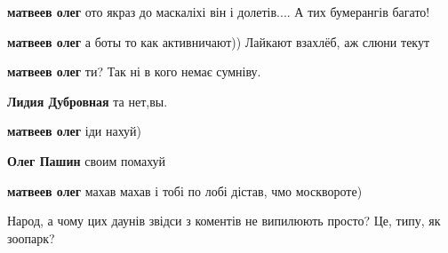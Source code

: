 \begin{itemize}
\begin{itemize}
\textbf{матвеев олег} ото якраз до маскаліхі він і долетів.... А тих бумерангів багато! \Laughey[1.0][white]

 
\textbf{матвеев олег} а боты то как активничают))
Лайкают взахлёб, аж слюни текут

 
\textbf{матвеев олег} ти? Так ні в кого немає сумніву.

 
\textbf{Лидия Дубровная} та нет,вы.

 
\textbf{матвеев олег} іди нахуй)

 
\textbf{Олег Пашин} своим помахуй

 
\textbf{матвеев олег} махав махав і тобі по лобі дістав, чмо москвороте)

Народ, а чому цих даунів звідси з коментів не випилюють просто? Це, типу, як зоопарк?


\end{itemize}
\end{itemize}
